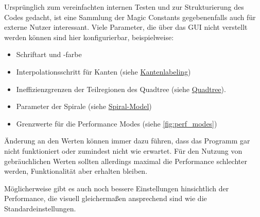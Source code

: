 
Ursprünglich zum vereinfachten internen Testen und zur Strukturierung des Codes gedacht, ist
eine Sammlung der Magic Constants gegebenenfalls auch für externe Nutzer interessant. Viele Parameter, die über das GUI
nicht verstellt werden können sind hier konfigurierbar, beispielweise:
\begin{itemize}
    \item Schriftart und -farbe
    \item Interpolationsschritt für Kanten (siehe \hyperref[subsec:labeling_edges]{Kantenlabeling})
    \item Ineffizienzgrenzen der Teilregionen des Quadtree (siehe \hyperref[subsec:quadtree]{Quadtree}).
    \item Parameter der Spirale (siehe \hyperref[subsubsec:spiral]{Spiral-Model})
    \item Grenzwerte für die Performance Modes (siehe \autoref{fig:perf_modes})
\end{itemize}

Änderung an den Werten können immer dazu führen, dass das Programm gar nicht funktioniert oder zumindest nicht wie erwartet.
Für den Nutzung von gebräuchlichen Werten sollten allerdings maximal die Performance schlechter werden, Funktionalität aber erhalten bleiben.

Möglicherweise gibt es auch noch bessere Einstellungen hinsichtlich der Performance, die visuell gleichermaßen ansprechend sind wie die Standardeinstellungen.